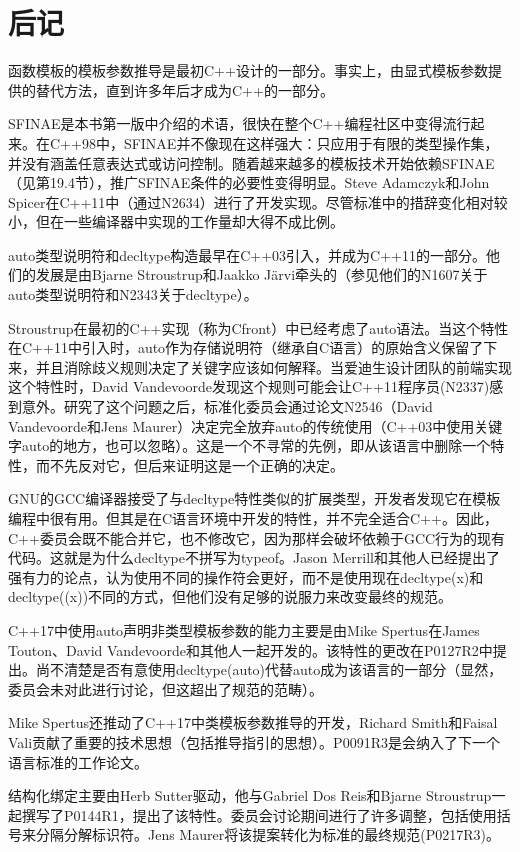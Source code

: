 \section{后记}
函数模板的模板参数推导是最初C++设计的一部分。事实上，由显式模板参数提供的替代方法，直到许多年后才成为C++的一部分。

SFINAE是本书第一版中介绍的术语，很快在整个C++编程社区中变得流行起来。在C++98中，SFINAE并不像现在这样强大：只应用于有限的类型操作集，并没有涵盖任意表达式或访问控制。随着越来越多的模板技术开始依赖SFINAE（见第19.4节），推广SFINAE条件的必要性变得明显。Steve Adamczyk和John Spicer在C++11中（通过N2634）进行了开发实现。尽管标准中的措辞变化相对较小，但在一些编译器中实现的工作量却大得不成比例。

auto类型说明符和decltype构造最早在C++03引入，并成为C++11的一部分。他们的发展是由Bjarne Stroustrup和Jaakko J{\"a}rvi牵头的（参见他们的N1607关于auto类型说明符和N2343关于decltype）。

Stroustrup在最初的C++实现（称为Cfront）中已经考虑了auto语法。当这个特性在C++11中引入时，auto作为存储说明符（继承自C语言）的原始含义保留了下来，并且消除歧义规则决定了关键字应该如何解释。当爱迪生设计团队的前端实现这个特性时，David Vandevoorde发现这个规则可能会让C++11程序员(N2337)感到意外。研究了这个问题之后，标准化委员会通过论文N2546（David Vandevoorde和Jens Maurer）决定完全放弃auto的传统使用（C++03中使用关键字auto的地方，也可以忽略）。这是一个不寻常的先例，即从该语言中删除一个特性，而不先反对它，但后来证明这是一个正确的决定。

GNU的GCC编译器接受了与decltype特性类似的扩展类型，开发者发现它在模板编程中很有用。但其是在C语言环境中开发的特性，并不完全适合C++。因此，C++委员会既不能合并它，也不修改它，因为那样会破坏依赖于GCC行为的现有代码。这就是为什么decltype不拼写为typeof。Jason Merrill和其他人已经提出了强有力的论点，认为使用不同的操作符会更好，而不是使用现在decltype(x)和decltype((x))不同的方式，但他们没有足够的说服力来改变最终的规范。

C++17中使用auto声明非类型模板参数的能力主要是由Mike Spertus在James Touton、David Vandevoorde和其他人一起开发的。该特性的更改在P0127R2中提出。尚不清楚是否有意使用decltype(auto)代替auto成为该语言的一部分（显然，委员会未对此进行讨论，但这超出了规范的范畴）。

Mike Spertus还推动了C++17中类模板参数推导的开发，Richard Smith和Faisal Vali贡献了重要的技术思想（包括推导指引的思想）。P0091R3是会纳入了下一个语言标准的工作论文。

结构化绑定主要由Herb Sutter驱动，他与Gabriel Dos Reis和Bjarne Stroustrup一起撰写了P0144R1，提出了该特性。委员会讨论期间进行了许多调整，包括使用括号来分隔分解标识符。Jens Maurer将该提案转化为标准的最终规范(P0217R3)。





